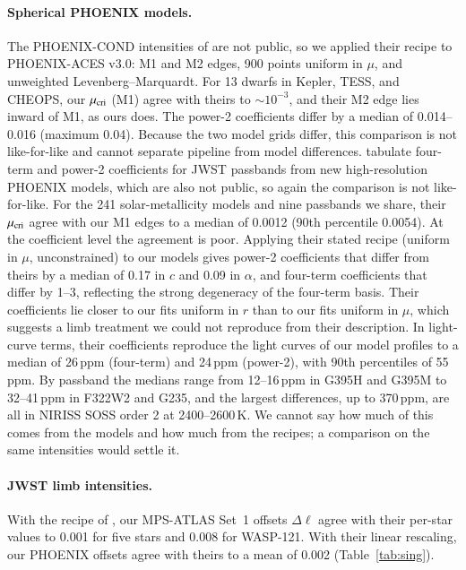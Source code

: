 \documentclass{aa}
\newcommand{\ppm}{\,\textrm{ppm}}
\begin{document}
\begin{appendix}
\paragraph{Spherical PHOENIX models.} The PHOENIX-COND intensities of
\citet{claretsouthworth2023} are not public, so we applied their recipe to
PHOENIX-ACES v3.0: M1 and M2 edges, 900 points uniform in $\mu$, and
unweighted Levenberg--Marquardt. For 13 dwarfs in Kepler, TESS, and CHEOPS, our
$\mu_{\rm cri}$ (M1) agree with theirs to $\sim10^{-3}$, and their M2 edge
lies inward of M1, as ours does. The power-2 coefficients differ by a median
of 0.014--0.016 (maximum 0.04). Because the two model grids differ, this
comparison is not like-for-like and cannot separate pipeline from model
differences. \citet{claret2025} tabulate four-term and power-2 coefficients for
JWST passbands from new high-resolution PHOENIX models, which are also not
public, so again the comparison is not like-for-like. For the 241
solar-metallicity models and nine passbands we share, their $\mu_{\rm cri}$
agree with our M1 edges to a median of 0.0012 (90th percentile 0.0054). At the
coefficient level the agreement is poor. Applying their stated recipe (uniform
in $\mu$, unconstrained) to our models gives power-2 coefficients that differ
from theirs by a median of 0.17 in $c$ and 0.09 in $\alpha$, and four-term
coefficients that differ by 1--3, reflecting the strong degeneracy of the
four-term basis. Their coefficients lie closer to our fits uniform in $r$ than
to our fits uniform in $\mu$, which suggests a limb treatment we could not
reproduce from their description. In light-curve terms, their coefficients
reproduce the light curves of our model profiles to a median of 26\ppm{}
(four-term) and 24\ppm{} (power-2), with 90th percentiles of 55\ppm. By
passband the medians range from 12--16\ppm{} in G395H and G395M to
32--41\ppm{} in F322W2 and G235, and the largest differences, up to 370\ppm,
are all in NIRISS SOSS order 2 at 2400--2600\,K. We cannot say how much of
this comes from the models and how much from the recipes; a comparison on the
same intensities would settle it.

\paragraph{JWST limb intensities.} With the recipe of \citet{sing2026}, our
MPS-ATLAS Set~1 offsets $\Delta\ell$ agree with their per-star values to
0.001 for five stars and 0.008 for WASP-121. With their linear rescaling, our
PHOENIX offsets agree with theirs to a mean of 0.002 (Table~\ref{tab:sing}).


\end{appendix}
\end{document}
